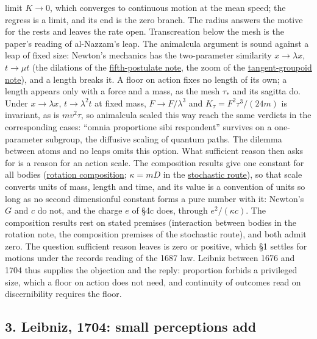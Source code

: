 \documentclass[11pt,a4paper]{article}
\begin{document}
\begin{itemize}
  limit \(K\to0\), which converges to continuous motion at the mean
  speed; the regress is a limit, and its end is the zero branch. The
  radius answers the motive for the rests and leaves the rate open.
  Transcreation below the mesh is the paper's reading of al-Nazzam's
  leap. The animalcula argument is sound against a leap of fixed size:
  Newton's mechanics has the two-parameter similarity \(x\to\lambda x\),
  \(t\to\mu t\) (the dilations of the
  \href{principia-fifth-postulate.md}{fifth-postulate note}, the zoom of
  the
  \href{groupoid-quantum-newton-states.md\#geometric-zoom-and-kernel-composition}{tangent-groupoid
  note}), and a length breaks it. A floor on action fixes no length of
  its own; a length appears only with a force and a mass, as the mesh
  \(\tau_*\) and its sagitta do. Under \(x\to\lambda x\),
  \(t\to\lambda^2t\) at fixed mass, \(F\to F/\lambda^3\) and
  \(K_\tau=F^2\tau^3/(24m)\) is invariant, as is \(mv^2\tau\), so
  animalcula scaled this way reach the same verdicts in the
  corresponding cases: ``omnia proportione sibi respondent'' survives on
  a one-parameter subgroup, the diffusive scaling of quantum paths. The
  dilemma between atoms and no leaps omits this option. What sufficient
  reason then asks for is a reason for an action scale. The composition
  results give one constant for all bodies
  (\href{rotation-composition-universality.md}{rotation composition};
  \(\kappa=mD\) in the
  \href{composition-universality.md\#continuous-free-paths-and-ultimate-velocity}{stochastic
  route}), so that scale converts units of mass, length and time, and
  its value is a convention of units so long as no second dimensionful
  constant forms a pure number with it: Newton's \(G\) and \(c\) do not,
  and the charge \(e\) of §4c does, through \(e^2/(\kappa c)\). The
  composition results rest on stated premises (interaction between
  bodies in the rotation note, the composition premises of the
  stochastic route), and both admit zero. The question sufficient reason
  leaves is zero or positive, which §1 settles for motions under the
  records reading of the 1687 law. Leibniz between 1676 and 1704 thus
  supplies the objection and the reply: proportion forbids a privileged
  size, which a floor on action does not need, and continuity of
  outcomes read on discernibility requires the floor.
\end{itemize}

\hypertarget{leibniz-1704-small-perceptions-add}{%
\subsection{3. Leibniz, 1704: small perceptions
add}\label{leibniz-1704-small-perceptions-add}}
\end{document}
